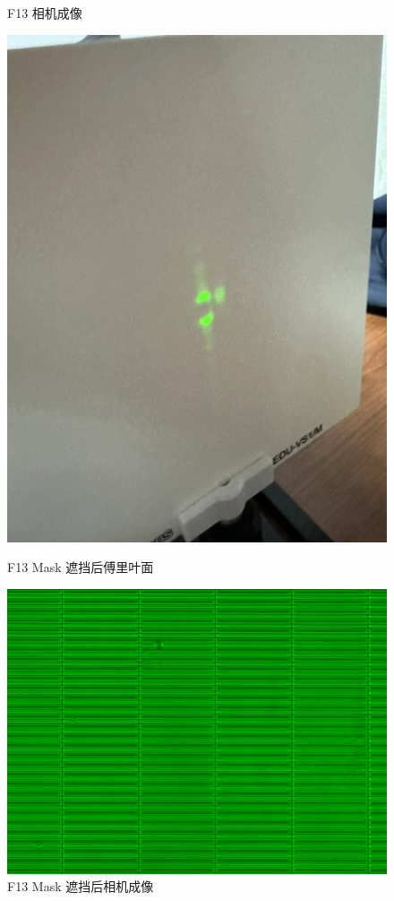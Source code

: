 \documentclass{ctexart}
\begin{document}
\begin{figure}[H]
\begin{minipage}[b]{0.2\textwidth}
    \caption{F13 相机成像}
  \end{minipage}
  \hspace{0.05\textwidth} %
  \begin{minipage}[b]{0.2\textwidth}
    \centering
    \includegraphics[width=\textwidth]{pictures/微信图片_20241010201100.jpg}
    \caption{F13 Mask 遮挡后傅里叶面}
  \end{minipage}
  \begin{minipage}[b]{0.2\textwidth}
    \centering
    \includegraphics[width=\textwidth]{pictures/F13-mask-Ex24.png}
    \caption{F13 Mask 遮挡后相机成像}
  \end{minipage}
\end{figure}
\end{document}
